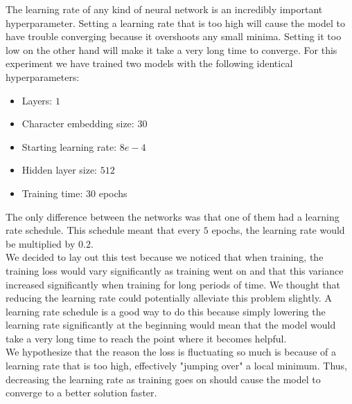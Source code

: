 The learning rate of any kind of neural network is an incredibly important hyperparameter. Setting a learning rate that is too high will cause the model to have trouble converging because it overshoots any small minima. Setting it too low on the other hand will make it take a very long time to converge. For this experiment we have trained two models with the following identical hyperparameters:
\begin{itemize}
    \item Layers: $1$
    \item Character embedding size: 30
    \item Starting learning rate: $8e-4$
    \item Hidden layer size: $512$
    \item Training time: 30 epochs
\end{itemize}
The only difference between the networks was that one of them had a learning rate schedule. This schedule meant that every $5$ epochs, the learning rate would be multiplied by $0.2$. \\

\noindent
We decided to lay out this test because we noticed that when training, the training loss would vary significantly as training went on and that this variance increased significantly when training for long periods of time. We thought that reducing the learning rate could potentially alleviate this problem slightly. A learning rate schedule is a good way to do this because simply lowering the learning rate significantly at the beginning would mean that the model would take a very long time to reach the point where it becomes helpful.\\

\noindent
We hypothesize that the reason the loss is fluctuating so much is because of a learning rate that is too high, effectively "jumping over" a local minimum. Thus, decreasing the learning rate as training goes on should cause the model to converge to a better solution faster.